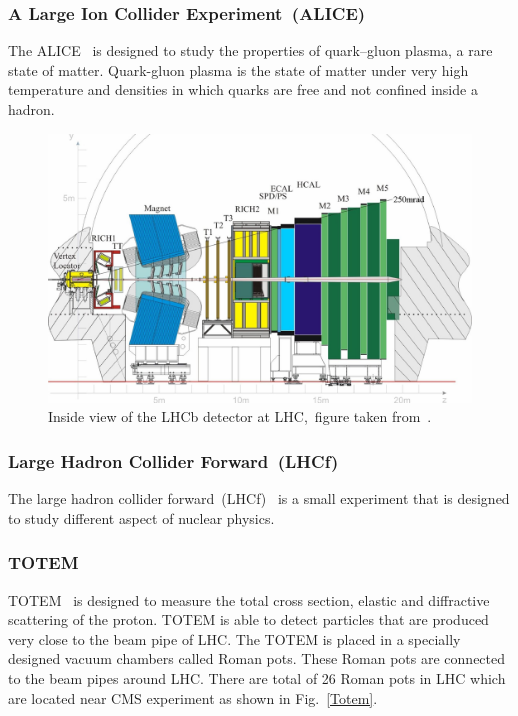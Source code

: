 \subsubsection{A Large Ion Collider Experiment~(ALICE)}
The ALICE~\cite{Collaboration_2008alice} is designed to study the properties of quark–gluon plasma, a rare state of matter. Quark-gluon plasma is the state of matter under very high temperature and densities in which quarks are free and not confined inside a hadron. 

\begin{figure}[H]
\centering
\includegraphics[scale=0.2]{chapter2/LHCb.png}
\caption{Inside view of the LHCb detector at LHC,~figure taken from~\cite{Mead:2780780}.}
\label{lhcb}
\end{figure}

\subsubsection{Large Hadron Collider Forward~(LHCf)}
The large hadron collider forward~(LHCf)~\cite{Collaboration_2008lhcf} is a small experiment that is designed to study different aspect of nuclear physics.

\subsubsection{TOTEM}
TOTEM~\cite{Collaboration_2008} is designed to measure the total cross section, elastic and diffractive scattering of the proton. TOTEM is able to detect particles that are produced very close to the beam pipe of LHC. The TOTEM is placed in a specially designed vacuum chambers called Roman pots. These Roman pots are connected to the beam pipes around LHC. There are total of 26 Roman pots in LHC which are located near CMS experiment as shown in Fig.~\ref{Totem}.

